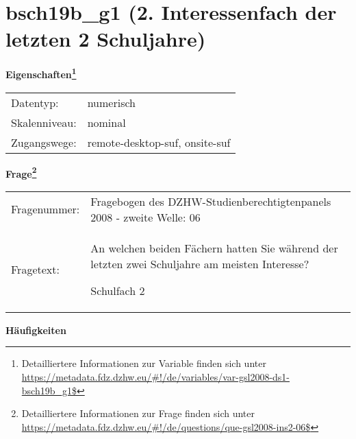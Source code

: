 
    \setcounter{footnote}{0}

    \vspace*{-1.8cm}
	\section{bsch19b\_g1 (2. Interessenfach der letzten 2 Schuljahre)}
	\label{section:bsch19b_g1}



    \vspace*{0.5cm}
    \noindent\textbf{Eigenschaften\footnote{Detailliertere Informationen zur Variable finden sich unter
		\url{https://metadata.fdz.dzhw.eu/\#!/de/variables/var-gsl2008-ds1-bsch19b_g1$}}}\\
	\begin{tabularx}{\hsize}{@{}lX}
	Datentyp: & numerisch \\
	Skalenniveau: & nominal \\
	Zugangswege: &
	  remote-desktop-suf, 
	  onsite-suf
 \\
    \end{tabularx}



				\vspace*{0.5cm}
                \noindent\textbf{Frage\footnote{Detailliertere Informationen zur Frage finden sich unter
		              \url{https://metadata.fdz.dzhw.eu/\#!/de/questions/que-gsl2008-ins2-06$}}}\\
				\begin{tabularx}{\hsize}{@{}lX}
					Fragenummer: &
					  Fragebogen des DZHW-Studienberechtigtenpanels 2008 - zweite Welle:
					  06
 \\
					Fragetext: & An welchen beiden Fächern hatten Sie während der letzten zwei Schuljahre am meisten Interesse?\par  Schulfach 2 \\
				\end{tabularx}





        		\vspace*{0.5cm}
                \noindent\textbf{Häufigkeiten}

